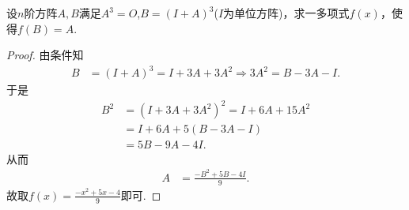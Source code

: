 \documentclass[../../main.tex]{subfiles}%
\begin{document}
\begin{example}
设$n$阶方阵$A,B$满足$A^3 = O$,$B = (I + A)^3$($I$为单位方阵)，求一多项式$f(x)$，使得$f(B) = A$.
\end{example}
\begin{proof}

由条件知
\begin{align*}
B&=(I + A)^3 = I + 3A + 3A^2\Longrightarrow 3A^2 = B - 3A - I.
\end{align*}
于是
\begin{align*}
B^2&=(I + 3A + 3A^2)^2 = I + 6A + 15A^2\\
&=I + 6A + 5(B - 3A - I)\\
&=5B - 9A - 4I.
\end{align*}
从而
\begin{align*}
A&=\frac{-B^2 + 5B - 4I}{9}.
\end{align*}
故取$f(x) = \frac{-x^2 + 5x - 4}{9}$即可.

\end{proof}
\end{document}
